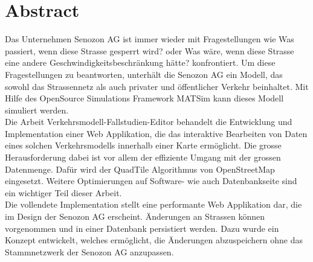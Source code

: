 \chapter{Abstract}
Das Unternehmen Senozon AG ist immer wieder mit Fragestellungen wie \glqq{}Was passiert, wenn diese Strasse gesperrt wird?\grqq{} oder \glqq{}Was wäre, wenn diese Strasse eine andere Geschwindigkeitsbeschränkung hätte?\grqq{} konfrontiert. Um diese Fragestellungen zu beantworten, unterhält die Senozon AG ein Modell, das sowohl das Strassennetz als auch privater und öffentlicher Verkehr beinhaltet. Mit Hilfe des OpenSource Simulations Framework MATSim kann dieses Modell simuliert werden.\\
Die Arbeit \glqq{}Verkehrsmodell-Fallstudien-Editor\grqq{} behandelt die Entwicklung und Implementation einer Web Applikation, die das interaktive Bearbeiten von Daten eines solchen Verkehrsmodells innerhalb einer Karte ermöglicht. Die grosse Herausforderung dabei ist vor allem der effiziente Umgang mit der grossen Datenmenge. Dafür wird der QuadTile Algorithmus von OpenStreetMap \cite{OSMQuadTiles} eingesetzt. Weitere Optimierungen auf Software- wie auch Datenbankseite sind ein wichtiger Teil dieser Arbeit.\\
Die vollendete Implementation stellt eine performante Web Applikation dar, die im Design der Senozon AG erscheint. Änderungen an Strassen können vorgenommen und in einer Datenbank persistiert werden. Dazu wurde ein Konzept entwickelt, welches ermöglicht, die Änderungen abzuspeichern ohne das Stammnetzwerk der Senozon AG anzupassen.\\